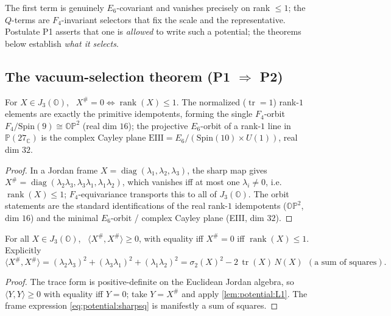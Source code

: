 The first term is genuinely $E_6$-covariant and vanishes precisely on rank $\le1$; the
$Q$-terms are $F_4$-invariant selectors that fix the scale and the representative. Postulate
P1 asserts that one is \emph{allowed} to write such a potential; the theorems below establish
\emph{what it selects}.

\subsection{The vacuum-selection theorem (P1 \texorpdfstring{$\Rightarrow$}{=>} P2)}
\label{sec:potential:theorem}

\begin{lemma}
\label{lem:potential:L1}
For $X\in J_3(\mathbb O)$, \ $X^\#=0\iff\operatorname{rank}(X)\le1$. The normalized
($\operatorname{tr}=1$) rank-$1$ elements are exactly the primitive idempotents, forming the
single $F_4$-orbit $F_4/\mathrm{Spin}(9)\cong\mathbb{OP}^2$ (real dim $16$); the
projective $E_6$-orbit of a rank-$1$ line in $\mathbb P(27_{\mathbb C})$ is the complex
Cayley plane $\mathrm{EIII}=E_6/(\mathrm{Spin}(10)\times U(1))$, real dim $32$.
\end{lemma}

\begin{proof}
In a Jordan frame $X=\operatorname{diag}(\lambda_1,\lambda_2,\lambda_3)$, the sharp map gives
$X^\#=\operatorname{diag}(\lambda_2\lambda_3,\lambda_3\lambda_1,\lambda_1\lambda_2)$, which
vanishes iff at most one $\lambda_i\neq0$, i.e. $\operatorname{rank}(X)\le1$; $F_4$-equivariance
transports this to all of $J_3(\mathbb O)$. The orbit statements are the standard
identifications of the real rank-$1$ idempotents ($\mathbb{OP}^2$, dim $16$) and the minimal
$E_6$-orbit / complex Cayley plane (EIII, dim $32$).
\end{proof}

\begin{theorem}
\label{thm:potential:T1}
For all $X\in J_3(\mathbb O)$, \ $\langle X^\#,X^\#\rangle\ge0$, with equality iff $X^\#=0$
iff $\operatorname{rank}(X)\le1$. Explicitly
\begin{equation}
\label{eq:potential:sharpsq}
\langle X^\#,X^\#\rangle=(\lambda_2\lambda_3)^2+(\lambda_3\lambda_1)^2+(\lambda_1\lambda_2)^2
=\sigma_2(X)^2-2\,\operatorname{tr}(X)\,N(X)\ \ (\text{a sum of squares}).
\end{equation}
\end{theorem}

\begin{proof}
The trace form is positive-definite on the Euclidean Jordan algebra, so $\langle Y,Y\rangle\ge0$
with equality iff $Y=0$; take $Y=X^\#$ and apply \autoref{lem:potential:L1}. The frame
expression \eqref{eq:potential:sharpsq} is manifestly a sum of squares.
\end{proof}

